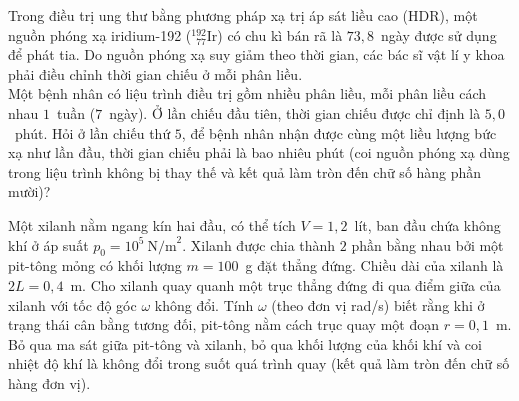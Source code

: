 	\begin{ex}%
		Trong điều trị ung thư bằng phương pháp xạ trị áp sát liều cao (HDR), một nguồn phóng xạ iridium-192 ($^{192}_{\phantom{1}77}\text{Ir}$) có chu kì bán rã là $73{,}8$~ngày được sử dụng để phát tia. Do nguồn phóng xạ suy giảm theo thời gian, các bác sĩ vật lí y khoa phải điều chỉnh thời gian chiếu ở mỗi phân liều.\\
		Một bệnh nhân có liệu trình điều trị gồm nhiều phân liều, mỗi phân liều cách nhau $1$~tuần ($7$~ngày). Ở lần chiếu đầu tiên, thời gian chiếu được chỉ định là $5{,}0$~phút. Hỏi ở lần chiếu thứ $5$, để bệnh nhân nhận được cùng một liều lượng bức xạ như lần đầu, thời gian chiếu phải là bao nhiêu phút (coi nguồn phóng xạ dùng trong liệu trình không bị thay thế và kết quả làm tròn đến chữ số hàng phần mười)?
		\par
	\end{ex}

	\begin{ex}%
		Một xilanh nằm ngang kín hai đầu, có thể tích $V=1{,}2$~lít, ban đầu chứa không khí ở áp suất $p_0=10^5~\text{N/m}^2$. Xilanh được chia thành $2$ phần bằng nhau bởi một pit-tông mỏng có khối lượng $m=100$~g đặt thẳng đứng. Chiều dài của xilanh là $2L=0{,}4$~m. Cho xilanh quay quanh một trục thẳng đứng đi qua điểm giữa của xilanh với tốc độ góc $\omega$ không đổi. Tính $\omega$ (theo đơn vị rad/s) biết rằng khi ở trạng thái cân bằng tương đối, pit-tông nằm cách trục quay một đoạn $r=0{,}1$~m. Bỏ qua ma sát giữa pit-tông và xilanh, bỏ qua khối lượng của khối khí và coi nhiệt độ khí là không đổi trong suốt quá trình quay (kết quả làm tròn đến chữ số hàng đơn vị).
		\par
	\end{ex}

